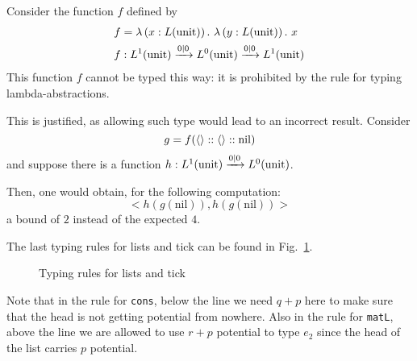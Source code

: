 \documentclass[ manuscript,screen, nonacm]{acmart}
\begin{document}
\begin{example}
    Consider the function \(f\) defined by
    \begin{align*}
    f &= \lambda\left(x:L(\mathrm{unit})\right).~\lambda\left(y:L(\mathrm{unit})\right).~x\\
    f &: L^1(\mathrm{unit}) \xrightarrow{0|0} L^0(\mathrm{unit}) \xrightarrow{0|0} L^1(\mathrm{unit})
    \end{align*}
    This function \(f\) cannot be typed this way: it is prohibited by the rule for
    typing lambda-abstractions.
    
    This is justified, as allowing such type would lead to an incorrect result.
    Consider
    \[
    g = f(\langle\rangle :: \langle\rangle :: \mathrm{nil})
    \]
    and suppose there is a function \(h : L^1(\mathrm{unit}) \xrightarrow{0 | 0} L^0(\mathrm{unit})\).
    
    Then, one would obtain, for the following computation:
    \[
    < h(g(\mathrm{nil})), h(g(\mathrm{nil})) >
    \]
    a bound of \(2\) instead of the expected \(4\).
\end{example}

The last typing rules for lists and tick can be found in Fig.~\ref{fig:ty-lists-tick}.
\begin{figure}
    \centering
    \caption{Typing rules for lists and tick}
    \label{fig:ty-lists-tick}
\end{figure}
Note that in the rule for \texttt{cons}, below the line we need $q+p$ here to make sure that the head is not getting potential from nowhere. Also in the rule for \texttt{matL}, above the line we are allowed to use $r+p$ potential to type $e_2$ since the head of the list carries $p$ potential.

\end{document}
